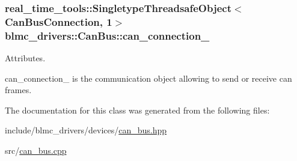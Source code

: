 \subsubsection[{\texorpdfstring{can\+\_\+connection\+\_\+}{can_connection_}}]{\setlength{\rightskip}{0pt plus 5cm}real\+\_\+time\+\_\+tools\+::\+Singletype\+Threadsafe\+Object$<${\bf Can\+Bus\+Connection}, 1$>$ blmc\+\_\+drivers\+::\+Can\+Bus\+::can\+\_\+connection\+\_\+\hspace{0.3cm}{\ttfamily [private]}}\hypertarget{classblmc__drivers_1_1CanBus_a996c9b1bc46071b2d002de38d6e9f781}{}\label{classblmc__drivers_1_1CanBus_a996c9b1bc46071b2d002de38d6e9f781}


Attributes. 

can\+\_\+connection\+\_\+ is the communication object allowing to send or receive can frames. 

The documentation for this class was generated from the following files\+:\begin{DoxyCompactItemize}
\item 
include/blmc\+\_\+drivers/devices/\hyperlink{can__bus_8hpp}{can\+\_\+bus.\+hpp}\item 
src/\hyperlink{can__bus_8cpp}{can\+\_\+bus.\+cpp}\end{DoxyCompactItemize}
